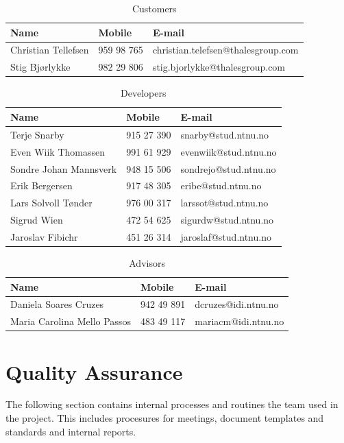 \begin{table}[!htb] \footnotesize \center
\caption{Customers\label{tab:plan:customer}}
\begin{tabular}{l l l}
	\toprule
	Name & Mobile & E-mail \\ 
	\midrule
	Christian Tellefsen & 959 98 765 & christian.telefsen@thalesgroup.com \\ 
	Stig Bjørlykke & 982 29 806 & stig.bjorlykke@thalesgroup.com \\ 
	\bottomrule
\end{tabular}
\end{table}

\begin{table}[!htb] \footnotesize \center
\caption{Developers\label{tab:plan:devs}}
\begin{tabular}{l l l}
	\toprule
	Name & Mobile & E-mail  \\ 
	\midrule
	Terje Snarby & 915 27 390 & snarby@stud.ntnu.no \\ 
	Even Wiik Thomassen & 991 61 929 & evenwiik@stud.ntnu.no \\ 
	Sondre Johan Mannsverk & 948 15 506 & sondrejo@stud.ntnu.no \\ 
	Erik Bergersen & 917 48 305 & eribe@stud.ntnu.no \\ 
	Lars Solvoll Tønder & 976 00 317 & larssot@stud.ntnu.no \\ 
	Sigrud Wien & 472 54 625 & sigurdw@stud.ntnu.no \\ 
	Jaroslav Fibichr & 451 26 314 & jaroslaf@stud.ntnu.no \\ 
	\bottomrule
\end{tabular}
\end{table}

\begin{table}[!htb] \footnotesize \center
\caption{Advisors\label{tab:plan:advisors}}
\begin{tabular}{l l l}
	\toprule
	Name & Mobile & E-mail \\ 
	\midrule
	Daniela Soares Cruzes & 942 49 891 & dcruzes@idi.ntnu.no \\ 
	Maria Carolina Mello Passos & 483 49 117 & mariacm@idi.ntnu.no \\ 
	\bottomrule
\end{tabular}
\end{table}


\section{Quality Assurance}
\label{sec:plan:qa}
The following section contains internal processes and routines the team used in the project. This includes procesures for meetings, document templates and standards and internal reports.

